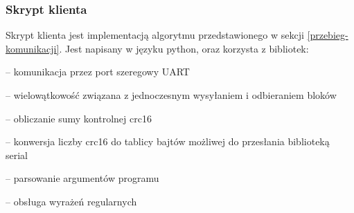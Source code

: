 \subsubsection{Skrypt klienta}
Skrypt klienta jest implementacją algorytmu przedstawionego w sekcji \ref{przebieg-komunikacji}. Jest napisany w języku python, oraz korzysta z bibliotek:
\begin{description}[noitemsep]
\item[serial] -- komunikacja przez port szeregowy UART
\item[threading] -- wielowątkowość związana z jednoczesnym wysyłaniem i odbieraniem bloków
\item[crcmod] -- obliczanie sumy kontrolnej crc16
\item[struct] -- konwersja liczby crc16 do tablicy bajtów możliwej do przesłania biblioteką serial
\item[argparse] -- parsowanie argumentów programu
\item[re] -- obsługa wyrażeń regularnych
\end{description}
